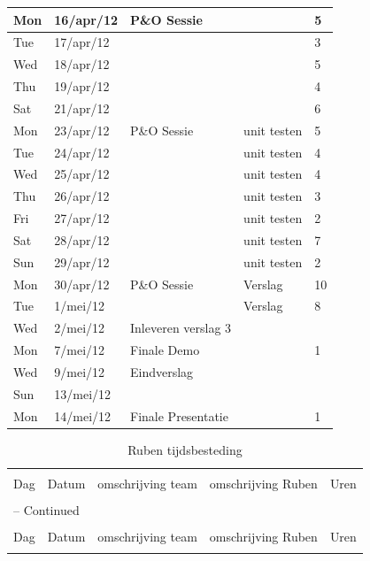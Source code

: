 \documentclass[12pt,a4paper]{report}
\begin{document}
\begin{landscape}
\begin{longtable}{llp{7cm}p{10cm}l}
\hline
Mon & 16/apr/12 & P\&O Sessie &  & 5 \\ 
\hline
Tue & 17/apr/12 &  &  & 3 \\ 
\hline
Wed & 18/apr/12 &  &  & 5 \\ 
\hline
Thu & 19/apr/12 &  &  & 4 \\ 
\hline
Sat & 21/apr/12 &  &  & 6 \\ 
\hline
Mon & 23/apr/12 & P\&O Sessie & unit testen & 5 \\ 
\hline
Tue & 24/apr/12 &  & unit testen & 4 \\ 
\hline
Wed & 25/apr/12 &  & unit testen & 4 \\ 
\hline
Thu & 26/apr/12 &  & unit testen & 3 \\ 
\hline
Fri & 27/apr/12 &  & unit testen & 2 \\ 
\hline
Sat & 28/apr/12 &  & unit testen & 7 \\ 
\hline
Sun & 29/apr/12 &  & unit testen & 2 \\ 
\hline
Mon & 30/apr/12 & P\&O Sessie & Verslag & 10 \\ 
\hline
Tue & 1/mei/12 &  & Verslag & 8 \\ 
\hline
Wed & 2/mei/12 & Inleveren verslag 3 &  &  \\ 
\hline
Mon & 7/mei/12 & Finale Demo &  & 1 \\ 
\hline
Wed & 9/mei/12 & Eindverslag &  &  \\ 
Sun & 13/mei/12 &  &  &  \\ 
\hline
Mon & 14/mei/12 & Finale Presentatie &  & 1 \\ 
\hline
\end{longtable}
\normalsize

\begin{longtable}{llp{7cm}p{10cm}l}
\caption{Ruben tijdsbesteding} \\

\hline \hline \\[-2ex]
  \multicolumn{1}{l}{Dag} & \multicolumn{1}{l}{Datum} &
  \multicolumn{1}{p{7cm}}{omschrijving team} &
  \multicolumn{1}{p{10cm}}{omschrijving Ruben} &
  \multicolumn{1}{l}{Uren}  \\[0.5ex] \hline \\[-1.8ex]
\endfirsthead

\multicolumn{5}{l}{{\tablename} \thetable{} -- Continued} \\[0.5ex]
\hline \hline \\[-2ex]
  \multicolumn{1}{l}{Dag} & \multicolumn{1}{l}{Datum} &
  \multicolumn{1}{p{7cm}}{omschrijving team} &
  \multicolumn{1}{p{10cm}}{omschrijving Ruben} &
  \multicolumn{1}{l}{Uren}  \\[0.5ex] \hline \\[-1.8ex]
\endhead


\end{longtable}
\end{landscape}
\end{document}
